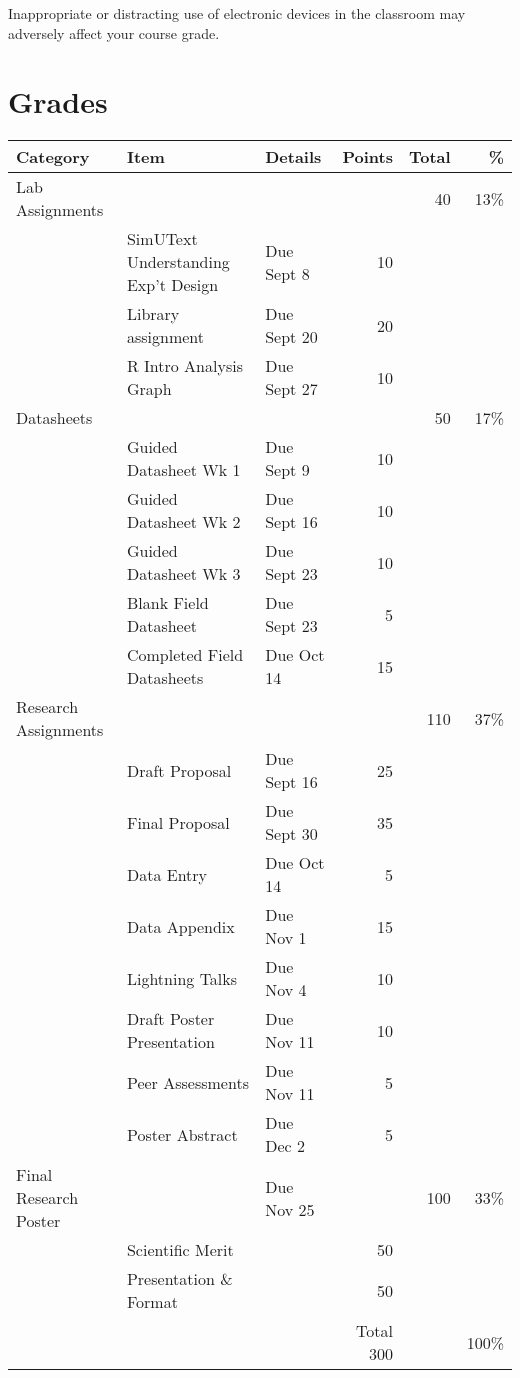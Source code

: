 \documentclass{tufte-handout}
\begin{document}
\begin{fullwidth}
Inappropriate or distracting use of electronic devices in the classroom may adversely affect your course grade. 

\section{Grades}













				

\begin{tabular}{l l l r r r}
Category & Item & Details & Points  & Total & \% \\
\hline
Lab Assignments & & &  & 40 & 13\% \\
& SimUText Understanding Exp't Design & Due Sept 8 &10 \\
& Library assignment & Due Sept 20 & 20 \\
& R Intro Analysis Graph & Due Sept 27 & 10 \\
\hline
Datasheets & & &  & 50 & 17\% \\
& Guided Datasheet Wk 1 & Due Sept 9 & 10 \\
& Guided Datasheet Wk 2 & Due Sept 16 & 10 \\
& Guided Datasheet Wk 3 & Due Sept 23 & 10 \\
& Blank Field Datasheet & Due Sept 23 & 5 \\
& Completed Field Datasheets & Due Oct 14 & 15 \\
\hline
Research Assignments & & & & 110 & 37\% \\
& Draft Proposal & Due Sept 16 & 25 \\
& Final Proposal & Due Sept 30 & 35 \\
& Data Entry & Due Oct 14 & 5 \\
& Data Appendix & Due Nov 1 & 15 \\
& Lightning Talks & Due Nov 4 & 10 \\
& Draft Poster Presentation & Due Nov 11 & 10 \\
& Peer Assessments & Due Nov 11 & 5 \\
& Poster Abstract & Due Dec 2 & 5 \\
\hline
Final Research Poster & & Due Nov 25 & & 100 & 33\% \\
& Scientific Merit &  & 50 \\
&  Presentation \& Format && 50 \\
\hline 
& & & Total 300 & & 100\% \\
\end{tabular}


\end{fullwidth}
\end{document}
